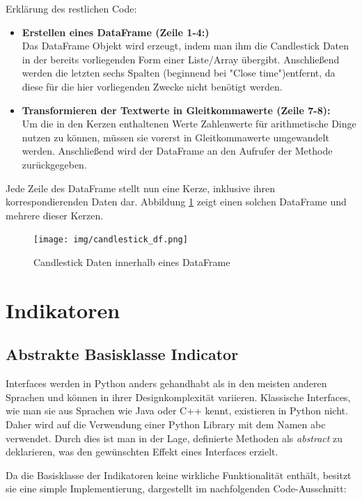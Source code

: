 \documentclass[oneside]{ausarbeitung}
\begin{document}
Erklärung des restlichen Code:
\begin{itemize}
	\item \textbf{Erstellen eines DataFrame (Zeile 1-4:)} \\
		Das DataFrame Objekt wird erzeugt, indem man ihm die Candlestick Daten in
		der bereits vorliegenden Form einer Liste/Array übergibt. Anschließend
		werden die letzten sechs Spalten (beginnend bei "Close time")entfernt, da
		diese für die hier vorliegenden Zwecke nicht benötigt werden.
	\item \textbf{Transformieren der Textwerte in Gleitkommawerte (Zeile 7-8):} \\
		Um die in den Kerzen enthaltenen Werte Zahlenwerte für arithmetische
		Dinge nutzen zu können, müssen sie vorerst in Gleitkommawerte umgewandelt
		werden.	Anschließend wird der DataFrame an den Aufrufer der Methode
		zurückgegeben.	
\end{itemize}

Jede Zeile des DataFrame stellt nun eine Kerze, inklusive ihren korrespondierenden Daten dar. Abbildung \ref{fig:16} zeigt einen solchen DataFrame und mehrere dieser Kerzen.

\begin{figure}[H]
  \centering
  \texttt{[image: img/candlestick\_df.png]}
  \caption{Candlestick Daten innerhalb eines DataFrame}
  \label{fig:16}
\end{figure}


\section{Indikatoren}
\label{sec:indikatoren}

\subsection{Abstrakte Basisklasse Indicator}
\label{sub:abstrakte_basisklasse_indikator}

Interfaces werden in Python anders gehandhabt als in den meisten anderen Sprachen und können in ihrer Designkomplexität variieren. Klassische Interfaces, wie man sie aus Sprachen wie Java oder C++ kennt, existieren in Python nicht. Daher wird auf die Verwendung einer Python Library mit dem Namen \ac{abc} verwendet. Durch dies ist man in der Lage, definierte Methoden als \textit{abstract} zu deklarieren, was den gewünschten Effekt eines Interfaces erzielt.

Da die Basisklasse der Indikatoren keine wirkliche Funktionalität enthält, besitzt sie eine simple Implementierung, dargestellt im nachfolgenden Code-Ausschnitt:
\end{document}
